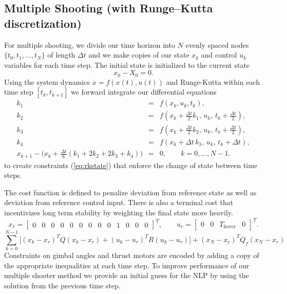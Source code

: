\documentclass[]{article}
\begin{document}
	




\subsection*{Multiple Shooting (with Runge–Kutta discretization)}
	For multiple shooting, we divide our time horizon into $N$ evenly spaced nodes $\{ t_0, t_1, \ldots, t_N \}$ of length $\Delta t$ and we make copies of our state $x_k$ and control $u_k$ variables for each time step.  The initial state is initialized to the current state
	\begin{equation*}
		x_0 - X_0 = 0.
	\end{equation*}
	Using the system dynamics $\dot{x} =  f(x(t),u(t))$ and Runge-Kutta within each time step $[t_k, t_{k+1}]$ we forward integrate our differential equations 
	\begin{eqnarray}
	 	k_1 & = & f(x_k, u_k, t_k), \nonumber \\[6pt] \nonumber 
	 	k_2 & = & f\!\left(x_k + \tfrac{\Delta t}{2} k_1,\, u_k,\, t_k + \tfrac{\Delta t}{2}\right), \\[6pt] \nonumber
	 	k_3 & = & f\!\left(x_k + \tfrac{\Delta t}{2} k_2,\, u_k,\, t_k + \tfrac{\Delta t}{2}\right), \\[6pt] \nonumber
	 	k_4 & = & f\!\left(x_k + \Delta t\, k_3,\, u_k,\, t_k + \Delta t\right), \\[10pt]
	 	x_{k+1} - \Big(x_k + \tfrac{\Delta t}{6}(k_1 + 2k_2 + 2k_3 + k_4)\Big) &=& 0, 
	 	\qquad k = 0,\dots, N-1. \label{eq:rkstate}
     \end{eqnarray}
     to create constraints (\ref{eq:rkstate}) that enforce the change of state between time steps.
        
	The cost function is defined to penalize deviation from reference state as well as deviation from reference control input. There is also a terminal cost that incentivizes long term stability by weighting the final state more heavily.
        \[
        x_r =
        \begin{bmatrix}
        0 & 0 & 0 & 0 & 0 & 0 & 0 & 0 & 0 & 1 & 0 & 0 & 0
        \end{bmatrix}^{\!T},
        \qquad
        u_r =
        \begin{bmatrix}
        0 & 0 & T_{\text{hover}} & 0
        \end{bmatrix}^{\!T}.
        \]
         \begin{equation}
         	 \sum_{k=0}^{N-1}  \Big[(x_k -  x_{r})^T Q (x_k - x_{r}) + (u_k -  u_{r})^T R (u_k - u_{r}) \Big] + (x_N -  x_{r})^T Q_f (x_N - x_{r})
         \end{equation}
	Constraints on gimbal angles and thrust motors are encoded by adding a copy of the appropriate inequalities at each time step. 	To improve performance of our multiple shooter method we provide an initial guess for the NLP by using the solution from the  previous time step.
	
\end{document}
